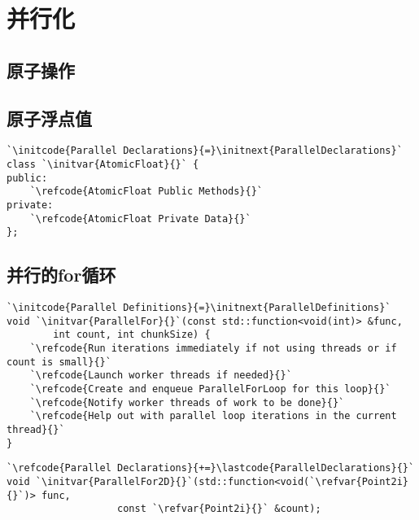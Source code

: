 \section{并行化}\label{sec:并行化}

\subsection{原子操作}\label{sub:原子操作}

\subsection{原子浮点值}\label{sub:原子浮点值}
\begin{lstlisting}
`\initcode{Parallel Declarations}{=}\initnext{ParallelDeclarations}`
class `\initvar{AtomicFloat}{}` {
public:
    `\refcode{AtomicFloat Public Methods}{}`
private:
    `\refcode{AtomicFloat Private Data}{}`
};
\end{lstlisting}

\subsection{并行的for循环}\label{sub:并行的for循环}
\begin{lstlisting}
`\initcode{Parallel Definitions}{=}\initnext{ParallelDefinitions}`
void `\initvar{ParallelFor}{}`(const std::function<void(int)> &func,
        int count, int chunkSize) {
    `\refcode{Run iterations immediately if not using threads or if count is small}{}`
    `\refcode{Launch worker threads if needed}{}`
    `\refcode{Create and enqueue ParallelForLoop for this loop}{}`
    `\refcode{Notify worker threads of work to be done}{}`
    `\refcode{Help out with parallel loop iterations in the current thread}{}`
}
\end{lstlisting}

\begin{lstlisting}
`\refcode{Parallel Declarations}{+=}\lastcode{ParallelDeclarations}{}`
void `\initvar{ParallelFor2D}{}`(std::function<void(`\refvar{Point2i}{}`)> func,
                   const `\refvar{Point2i}{}` &count);
\end{lstlisting}